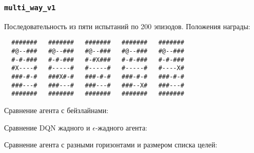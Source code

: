 \documentclass[a4paper]{article}
\begin{document}

\subsubsection{\texttt{multi\_way\_v1}}

Последовательность из пяти испытаний по 200 эпизодов. Положения награды:

\begin{verbatim}
  #######   #######   #######   #######   #######
  #@--###   #@--###   #@--###   #@--###   #@--###
  #-#-###   #-#-###   #-#X###   #-#-###   #-#-###
  #X----#   #-----#   #-----#   #-----#   #----X#
  ###-#-#   ###X#-#   ###-#-#   ###-#-#   ###-#-#
  ###---#   ###---#   ###---#   ###--X#   ###---#
  #######   #######   #######   #######   #######
\end{verbatim}

Сравнение агента с бейзлайнами:


Сравнение DQN жадного и $\epsilon$-жадного агента:


Сравнение агента с разными горизонтами и размером списка целей:

  

  

  
  
\end{document}
